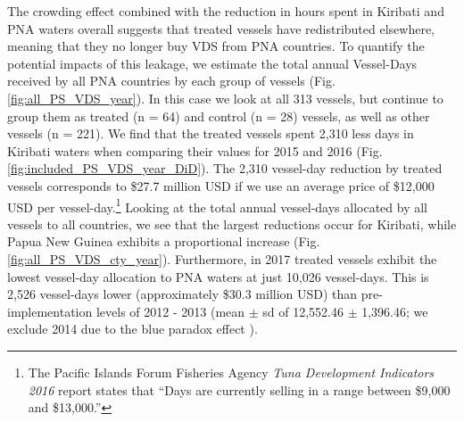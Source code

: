 \documentclass[9p,twocolumn,twoside,lineno]{pnas-new}
\begin{document}
The crowding effect combined with the reduction in hours spent in Kiribati and PNA waters overall suggests that treated vessels have redistributed elsewhere, meaning that they no longer buy VDS from PNA countries. To quantify the potential impacts of this leakage, we estimate the total annual Vessel-Days received by all PNA countries by each group of vessels (Fig. \ref{fig:all_PS_VDS_year}). In this case we look at all 313 vessels, but continue to group them as treated (n = 64) and control (n = 28) vessels, as well as other vessels (n = 221). We find that the treated vessels spent 2,310 less days in Kiribati waters when comparing their values for 2015 and 2016 (Fig. \ref{fig:included_PS_VDS_year_DiD}). The 2,310 vessel-day reduction by treated vessels corresponds to \$27.7 million USD if we use an average price of \$12,000 USD per vessel-day.\footnote{The Pacific Islands Forum Fisheries Agency \emph{Tuna Development Indicators 2016} report states that ``Days are currently selling in a range between \$9,000 and \$13,000.''} Looking at the total annual vessel-days allocated by all vessels to all countries, we see that the largest reductions occur for Kiribati, while Papua New Guinea exhibits a proportional increase (Fig. \ref{fig:all_PS_VDS_cty_year}). Furthermore, in 2017 treated vessels exhibit the lowest vessel-day allocation to PNA waters at just 10,026 vessel-days. This is 2,526 vessel-days lower (approximately \$30.3 million USD) than pre-implementation levels of 2012 - 2013 (mean $\pm$ sd of 12,552.46 $\pm$ 1,396.46; we exclude 2014 due to the blue paradox effect \cite{mcdermott_2018}). %
\end{document}
